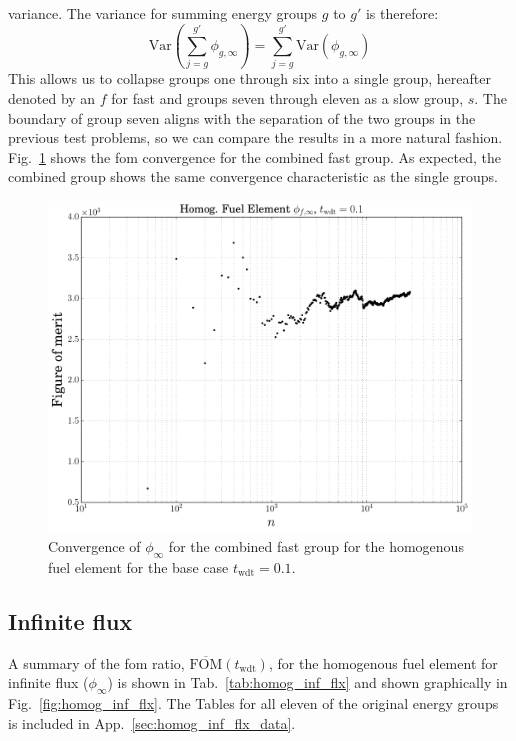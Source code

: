 variance.  The variance for summing energy groups $g$ to $g'$ is therefore:
\begin{equation*}
  \mathrm{Var}\left( \sum_{j=g}^{g'}\phi_{g,\infty}\right) =   \sum_{j=g}^{g'}\mathrm{Var}\left(\phi_{g,\infty}\right)
\end{equation*}
This allows us to collapse groups one through six into a single group,
hereafter denoted by an $f$ for fast and groups seven through eleven as
 a slow group, $s$. The boundary of group seven aligns with the separation
of the two groups in the previous test problems, so we can compare the
results in a more natural
fashion. Fig.~\ref{fig:homog_fom_convergence_example} shows the
\gls{fom} convergence for the combined fast group. As expected, the
combined group shows the same convergence characteristic as the single
groups.

\begin{figure}[hbtp]
  \centering
  \includegraphics[scale=0.5]{images/homog_fom_convergence_example}
  \caption{Convergence of $\phi_{\infty}$ for the combined fast group
    for the homogenous fuel element for the base case
    $t_{\mathrm{wdt}} = 0.1$.}
  \label{fig:homog_fom_convergence_example}
\end{figure}

\subsection{Infinite flux}
\label{sec:homog_inf_flx}

A summary of the \gls{fom} ratio,
$\overline{\mathrm{FOM}}(t_{\mathrm{wdt}})$, for the homogenous fuel
element for infinite flux ($\phi_{\infty}$) is shown in
Tab.~\ref{tab:homog_inf_flx} and shown graphically in
Fig.~\ref{fig:homog_inf_flx}. The Tables for all eleven of the
original energy groups is included in
App.~\ref{sec:homog_inf_flx_data}.

